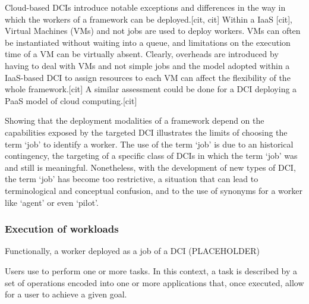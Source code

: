 \documentclass{sig-alternate}
\begin{document}
Cloud-based DCIs introduce notable exceptions and differences in the way in which the workers of a \pilotjob framework can be deployed.[cit, cit] Within a IaaS [cit], Virtual Machines (VMs) and not jobs are used to deploy workers. VMs can often be instantiated without waiting into a queue, and limitations on the execution time of a VM can be virtually absent. Clearly, overheads are introduced by having to deal with VMs and not simple jobs and the model adopted within a IaaS-based DCI to assign resources to each VM can affect the flexibility of the whole \pilotjob framework.[cit] A similar assessment could be done for a DCI deploying a PaaS model of cloud computing.[cit]

Showing that the deployment modalities of a \pilotjob framework depend on the capabilities exposed by the targeted DCI illustrates the limits of choosing the term `job' to identify a worker. The use of the term `job' is due to an historical contingency, the targeting of a specific class of DCIs in which the term `job' was and still is meaningful. Nonetheless, with the development of new types of DCI, the term `job' has become too restrictive, a situation that can lead to terminological and conceptual confusion, and to the use of synonyms for a worker like `agent' or even `pilot'.

\subsubsection{Execution of workloads}


Functionally, a worker deployed as a job of a DCI  (PLACEHOLDER)


Users use \pilotjobs to perform one or more tasks. In this context, a task is described by a set of operations encoded into one or more applications that, once executed, allow for a user to achieve a given goal.



\end{document}
